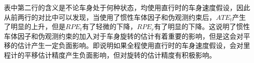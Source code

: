 \begin{table}
\centering
\caption{PO-VIO模块消融实验}
\label{tab:vio_ablation}
\end{table}

表中第二行的含义是不论车身处于何种状态，均使用直行时的车身速度假设，因此从前两行的对比中可以发现，当使用了惯性车体因子和伪观测约束后，$ATE_t$产生了明显的上升，但是$RPE_t$有了轻微的下降，$RPE_r$有了明显的下降。这说明了惯性车体因子和伪观测约束的加入对于车身旋转的估计有着重要的影响，但是这会对平移的估计产生一定负面影响。即说明如果全程使用直行时的车身速度假设，会对里程计的平移估计精度产生负面影响，但对旋转的估计精度有积极影响。

